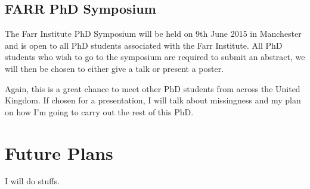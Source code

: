 \documentclass[bsc]{abdnthesis}
\begin{document}
\section{FARR PhD Symposium} %
\label{sec:farr_phd}
The Farr Institute PhD Symposium will be held on 9th June 2015 in Manchester\cite{ farr-phd} and is open to all PhD students associated with the Farr Institute. All PhD students who wish to go to the symposium are required to submit an abstract, we will then be chosen to either give a talk or present a poster. 

Again, this is a great chance to meet other PhD students from across the United Kingdom. If chosen for a presentation, I will talk about missingness and my plan on how I'm going to carry out the rest of this PhD.


\chapter{Future Plans}
I will do stuffs.
\end{document}
